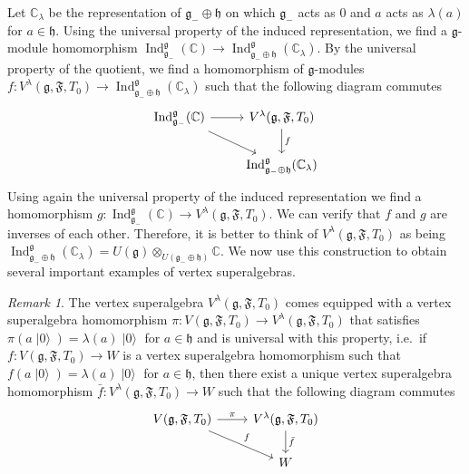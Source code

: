 \documentclass[a4paper, 12pt, reqno]{amsart}
\theoremstyle{remark}
\newtheorem{remark}[theorem]{Remark}
\numberwithin{equation}{subsection}
\DeclareMathOperator{\Ind}{Ind}
\DeclareMathOperator{\vac}{|0\rangle}
\begin{document}
Let $\mathbb{C}_{\lambda}$ be the representation of $\mathfrak{g}_- \oplus \mathfrak{h}$ on which $\mathfrak{g}_-$ acts as $0$ and $a$ acts as $\lambda(a)$ for $a \in \mathfrak{h}$.
Using the universal property of the induced representation, we find a $\mathfrak{g}$-module homomorphism $\Ind^{\mathfrak{g}}_{\mathfrak{g}_-}(\mathbb{C}) \to \Ind^{\mathfrak{g}}_{\mathfrak{g}_- \oplus \mathfrak{h}}(\mathbb{C}_{\lambda})$.
By the universal property of the quotient, we find a homomorphism of $\mathfrak{g}$-modules $f: V^{\lambda}(\mathfrak{g}, \mathfrak{F}, T_0) \to \Ind^{\mathfrak{g}}_{\mathfrak{g}_- \oplus \mathfrak{h}}(\mathbb{C}_{\lambda})$ such that the following diagram commutes
\begin{equation*}
  \begin{tikzcd}
    {\Ind^{\mathfrak{g}}_{\mathfrak{g}_-}(\mathbb{C})} \arrow[rd] \arrow[r] & {V^{\lambda}(\mathfrak{g}, \mathfrak{F}, T_0)} \arrow[d, "f"] \\
    & \Ind^{\mathfrak{g}}_{\mathfrak{g}_- \oplus \mathfrak{h}}(\mathbb{C}_{\lambda})
  \end{tikzcd}
\end{equation*}
Using again the universal property of the induced representation we find a homomorphism $g: \Ind^{\mathfrak{g}}_{\mathfrak{g}_-}(\mathbb{C}) \to V^{\lambda}(\mathfrak{g}, \mathfrak{F}, T_0)$.
We can verify that $f$ and $g$ are inverses of each other.
Therefore, it is better to think of $V^{\lambda}(\mathfrak{g}, \mathfrak{F}, T_0)$ as being $\Ind^{\mathfrak{g}}_{\mathfrak{g}_- \oplus \mathfrak{h}}(\mathbb{C}_{\lambda}) = U(\mathfrak{g}) \otimes_{U(\mathfrak{g}_- \oplus \mathfrak{h})} \mathbb{C}$.
We now use this construction to obtain several important examples of vertex superalgebras.

\begin{remark}
  \label{rmk:16}
  The vertex superalgebra $V^{\lambda}(\mathfrak{g}, \mathfrak{F}, T_0)$ comes equipped with a vertex superalgebra homomorphism $\pi: V(\mathfrak{g}, \mathfrak{F}, T_0) \to V^{\lambda}(\mathfrak{g}, \mathfrak{F}, T_0)$ that satisfies $\pi(a\vac) = \lambda(a)\vac$ for $a \in \mathfrak{h}$ and is universal with this property, i.e.\ if $f: V(\mathfrak{g}, \mathfrak{F}, T_0) \to W$ is a vertex superalgebra homomorphism such that $f(a\vac) = \lambda(a)\vac$ for $a \in \mathfrak{h}$, then there exist a unique vertex superalgebra homomorphism $\bar{f}: V^{\lambda}(\mathfrak{g}, \mathfrak{F}, T_0) \to W$ such that the following diagram commutes
  \begin{equation*}
    \begin{tikzcd}
      {V(\mathfrak{g}, \mathfrak{F}, T_0)} \arrow[rd, "f"] \arrow[r, "\pi"] & {V^{\lambda}(\mathfrak{g}, \mathfrak{F}, T_0)} \arrow[d, "\bar{f}"] \\
      & W
    \end{tikzcd}
  \end{equation*}
\end{remark}
\end{document}
